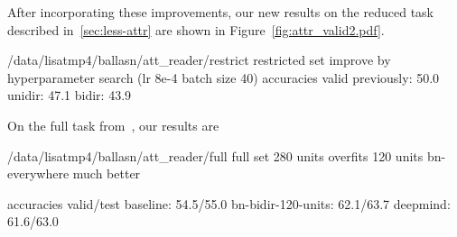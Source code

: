 \documentclass{article} %
\begin{document}
After incorporating these improvements, our new results on the reduced task described in~\ref{sec:less-attr} are shown in Figure~\ref{fig:attr_valid2.pdf}.

/data/lisatmp4/ballasn/att\_reader/restrict
restricted set
improve by hyperparameter search
(lr 8e-4 batch size 40)
accuracies valid
previously: 50.0
unidir: 47.1
bidir: 43.9

On the full task from~\citet{attentivereader}, our results are

/data/lisatmp4/ballasn/att\_reader/full
full set
280 units overfits
120 units bn-everywhere much better

accuracies valid/test
baseline: 54.5/55.0
bn-bidir-120-units: 62.1/63.7
deepmind: 61.6/63.0
\end{document}
